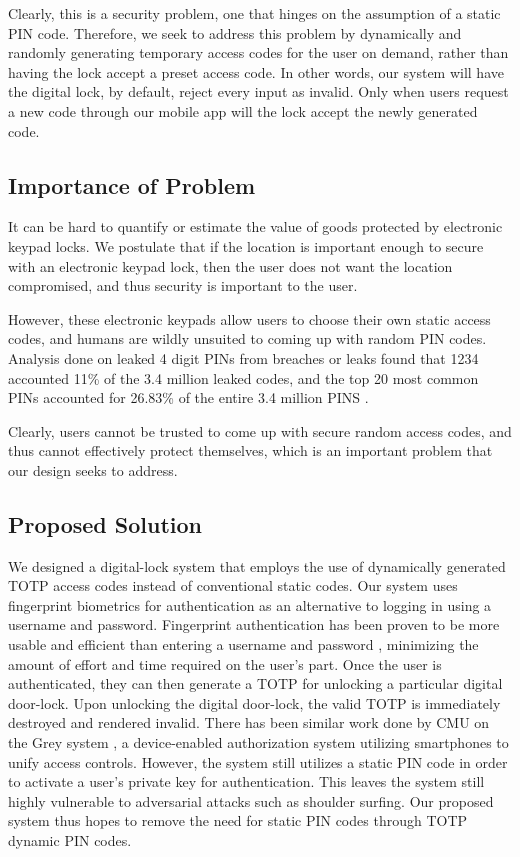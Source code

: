\documentclass[conference]{IEEEtran}
\begin{document}
Clearly, this is a security problem, one that hinges on the assumption of a static PIN code. Therefore, we seek to address this problem by dynamically and randomly generating temporary access codes for the user on demand, rather than having the lock accept a preset access code. In other words, our system will have the digital lock, by default, reject every input as invalid. Only when users request a new code through our mobile app will the lock accept the newly generated code.

\subsection{Importance of Problem}
It can be hard to quantify or estimate the value of goods protected by electronic keypad locks. We postulate that if the location is important enough to secure with an electronic keypad lock, then the user does not want the location compromised, and thus security is important to the user. 

	However, these electronic keypads allow users to choose their own static access codes, and humans are wildly unsuited to coming up with random PIN codes. Analysis done on leaked 4 digit PINs from breaches or leaks found that 1234 accounted 11\% of the 3.4 million leaked codes, and the top 20 most common PINs accounted for 26.83\% of the entire 3.4 million PINS \cite{b1}.
	
	Clearly, users cannot be trusted to come up with secure random access codes, and thus cannot effectively protect themselves, which is an important problem that our design seeks to address.

\subsection{Proposed Solution}
	We designed a digital-lock system that employs the use of dynamically generated TOTP access codes instead of conventional static codes. Our system uses fingerprint biometrics for authentication as an alternative to logging in using a username and password. Fingerprint authentication has been proven to be more usable and efficient than entering a username and password \cite{ab2}, minimizing the amount of effort and time required on the user’s part. Once the user is authenticated, they can then generate a TOTP for unlocking a particular digital door-lock. Upon unlocking the digital door-lock, the valid TOTP is immediately destroyed and rendered invalid. 
	There has been similar work done by CMU on the Grey system \cite{ab3}, a device-enabled authorization system utilizing smartphones to unify access controls. However, the system still utilizes a static PIN code in order to activate a user’s private key for authentication. This leaves the system still highly vulnerable to adversarial attacks such as shoulder surfing. Our proposed system thus hopes to remove the need for static PIN codes through TOTP dynamic PIN codes. 
\end{document}
